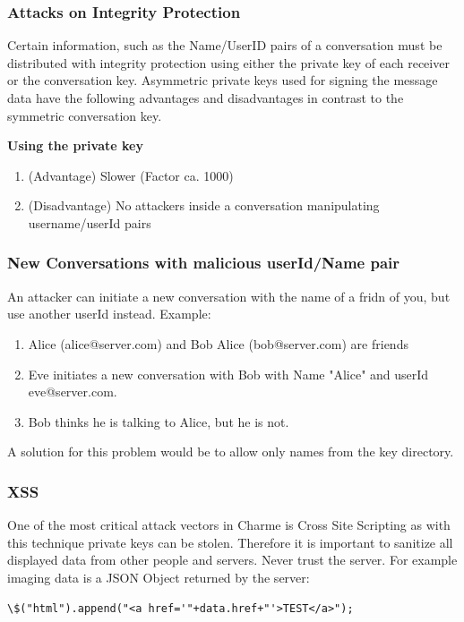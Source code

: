 \documentclass{scrartcl}
\begin{document}
   \subsubsection{Attacks on Integrity Protection}
   Certain information, such as the Name/UserID pairs of a conversation must be distributed with integrity protection using either the private key of each receiver or the conversation key. Asymmetric private keys used for signing the message data have the following advantages and disadvantages in contrast to the symmetric conversation key.
   
   \textbf{Using the private key }
   \begin{enumerate}
   \item (Advantage) Slower (Factor ca. 1000)
    \item (Disadvantage) No attackers inside a conversation manipulating username/userId pairs
   \end{enumerate}
   
     \subsubsection{New Conversations with malicious userId/Name pair}
     An attacker can initiate a new conversation with the name of a fridn of you, but use another userId instead. Example:
      \begin{enumerate}
     \item Alice (alice@server.com) and Bob Alice (bob@server.com) are friends
     \item Eve initiates a new conversation with Bob with Name "Alice" and userId eve@server.com. 
     \item Bob thinks he is talking to Alice, but he is not.
     \end{enumerate}
     A solution for this problem would be to allow only names from the key directory.
   \subsubsection{XSS}
   One of the most critical attack vectors in Charme is Cross Site Scripting as with this technique private keys can be stolen.
   Therefore it is important to sanitize all displayed data from other people and servers. Never trust the server. For example imaging data is a JSON Object returned by the server:
   
       \begin{lstlisting}
\$("html").append("<a href='"+data.href+"'>TEST</a>");
    \end{lstlisting}
    
\end{document}
